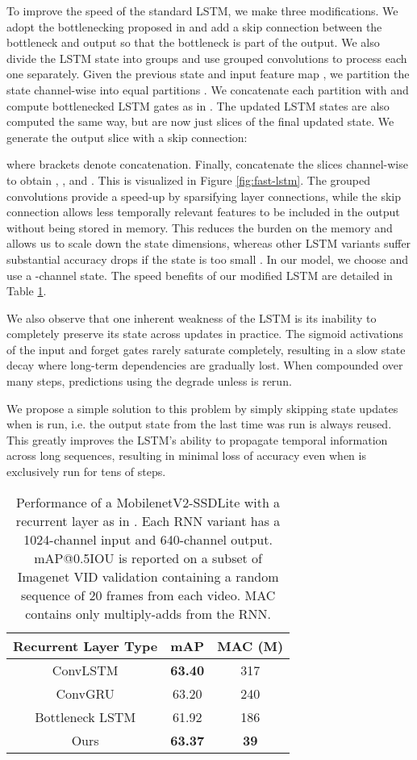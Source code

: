 \documentclass[10pt,twocolumn,letterpaper]{article}
\begin{document}
To improve the speed of the standard LSTM, we make three modifications. We adopt the bottlenecking proposed in \cite{liu2018mobile} and add a skip connection between the bottleneck and output so that the bottleneck is part of the output. We also divide the LSTM state into groups and use grouped convolutions to process each one separately. Given the previous state  and input feature map , we partition the state channel-wise into  equal partitions . We concatenate each partition with  and compute bottlenecked LSTM gates  as in \cite{liu2018mobile}. The updated LSTM states  are also computed the same way, but are now just slices of the final updated state. We generate the output slice with a skip connection:

where brackets denote concatenation. Finally, concatenate the slices channel-wise to obtain , , and . This is visualized in Figure \ref{fig:fast-lstm}. The grouped convolutions provide a speed-up by sparsifying layer connections, while the skip connection allows less temporally relevant features to be included in the output without being stored in memory. This reduces the burden on the memory and allows us to scale down the state dimensions, whereas other LSTM variants suffer substantial accuracy drops if the state is too small \cite{liu2018mobile}. In our model, we choose  and use a -channel state. The speed benefits of our modified LSTM are detailed in Table \ref{tab:lstm}.

We also observe that one inherent weakness of the LSTM is its inability to completely preserve its state across updates in practice. The sigmoid activations of the input and forget gates rarely saturate completely, resulting in a slow state decay where long-term dependencies are gradually lost. When compounded over many steps, predictions using the  degrade unless  is rerun.

We propose a simple solution to this problem by simply skipping state updates when  is run, i.e. the output state from the last time  was run is always reused. This greatly improves the LSTM's ability to propagate temporal information across long sequences, resulting in minimal loss of accuracy even when  is exclusively run for tens of steps.

\begin{table}[t]
\begin{tabular}{c | c | c }
Recurrent Layer Type & mAP & MAC (M) \\ 
\toprule [0.2em]
ConvLSTM & \textbf{63.40} & 317 \\
ConvGRU & 63.20 & 240 \\
Bottleneck LSTM \cite{liu2018mobile} & 61.92 & 186 \\
Ours & \textbf{63.37} & \textbf{39} \\
\bottomrule [0.2em]
\end{tabular}
\centering
\caption{Performance of a MobilenetV2-SSDLite with a recurrent layer as in \cite{liu2018mobile}. Each RNN variant has a 1024-channel input and 640-channel output. mAP@0.5IOU is reported on a subset of Imagenet VID validation containing a random sequence of 20 frames from each video. MAC contains only multiply-adds from the RNN.}
\label{tab:lstm}
\end{table}
\end{document}
